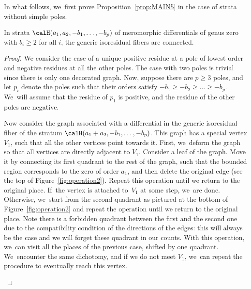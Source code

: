 In what follows, we~first prove Proposition~\ref{prop:MAIN5} in the case of strata without simple poles.
\begin{lem}\label{lem:MAIN5nosimple}
In strata $\calH(a_{1},a_{2},-b_{1},\dots,-b_{p})$ of meromorphic differentials of genus zero with $b_{i}\geq2$ for all $i$, the generic isoresidual fibers are connected.
\end{lem}
\begin{proof}
We consider the case of a unique positive residue at a pole of lowest order and negative residues at all the other poles. The case with two poles is trivial since there is only one decorated graph. Now, suppose there are $p\geq3$ poles, and let $p_i$ denote the poles such that their orders satisfy $-b_{1}\geq -b_{2}\geq \dots \geq -b_{p}$. We~will assume that the residue of $p_{1}$ is positive, and the residue of the other poles are negative.

Now consider the graph associated with a differential in the generic isoresidual fiber of the stratum $\calH(a_{1}+a_{2},-b_{1},\dots,-b_{p})$. This graph has a special vertex $V_{1}$, such that all the other vertices point towards it. First, we~deform the graph so that all vertices are directly adjacent to $V_{1}$. Consider a leaf of the graph. Move it by connecting its first quadrant to the rest of the graph, such that the bounded region corresponds to the zero of order $a_{1}$, and then delete the original edge (see the top of Figure~\ref{fig:operation2}). Repeat this operation until we return to the original place. If~the vertex is attached to~$V_{1}$ at some step, we~are done. Otherwise, we~start from the second quadrant as pictured at the bottom of Figure~\ref{fig:operation2} and repeat the operation until we return to the original place. Note there is a forbidden quadrant between the first and the second one due to the compatibility condition of the directions of the edges: this will always be the case and we will forget these quadrant in our counts. With this operation, we~can visit all the places of the previous case, shifted by one quadrant. We~encounter the same dichotomy, and if we do not meet $V_{1}$, we~can repeat the procedure to eventually reach this vertex.
\begin{figure}[ht]
\end{figure}
\end{proof}
